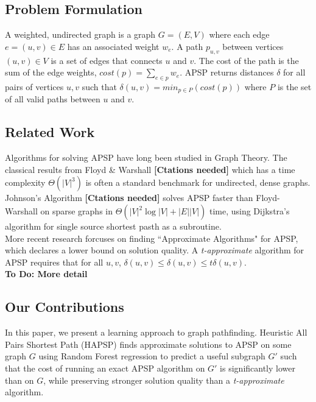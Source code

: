 \documentclass[journal]{IEEEtran}
\begin{document}
\subsection{Problem Formulation}
	A weighted, undirected graph is a graph $G=(E,V)$ where each edge $e=(u,v)\in E$ has an associated weight
	$w_e$. A path $p_{u,v}$ between vertices $(u,v)\in V$ is a set of edges that connects $u$ and $v$. The cost
	of the path is the sum of the edge weights, $cost(p) = \sum_{e\in p}w_e$. APSP returns distances $\delta$
	for all pairs of vertices $u,v$ such that $\delta(u,v) = min_{p\in P} (cost(p))$ where $P$ is the set of
	all valid paths between $u$ and $v$.

\subsection{Related Work}
	Algorithms for solving APSP have long been studied in Graph Theory. The classical results from
	Floyd \& Warshall
	{\bf{[Ctations needed]}}
	which has a time complexity $\Theta(|V|^3)$ is often a standard benchmark for undirected, dense graphs.
	Johnson's Algorithm
	{\bf{[Ctations needed]}}
	solves APSP faster than Floyd-Warshall on sparse graphs in $\Theta(|V|^2 \log|V|+ |E||V|)$ time,
	using Dijkstra's algorithm for single source shortest pasth as a subroutine. \\
	
	More recent research forcuses on finding ``Approximate Algorithms" for APSP, which declares a
	lower bound on solution quality. A {\it{t-approximate}} algorithm for APSP requires that
	for all $u,v$, $\delta(u,v) \le \hat{\delta}(u,v) \le t\delta(u,v)$.\\
	{\bf{To Do: More detail}}
	
\subsection{Our Contributions}
	In this paper, we present a learning approach to graph pathfinding. Heuristic All Pairs Shortest Path (HAPSP)
	finds approximate solutions to APSP on some graph $G$
	using Random Forest regression to predict a useful subgraph $G'$ such that the cost of running an exact
	APSP algorithm on $G'$ is significantly lower than on $G$, while preserving stronger solution quality
	than a {\it{t-approximate}} algorithm.
\end{document}

